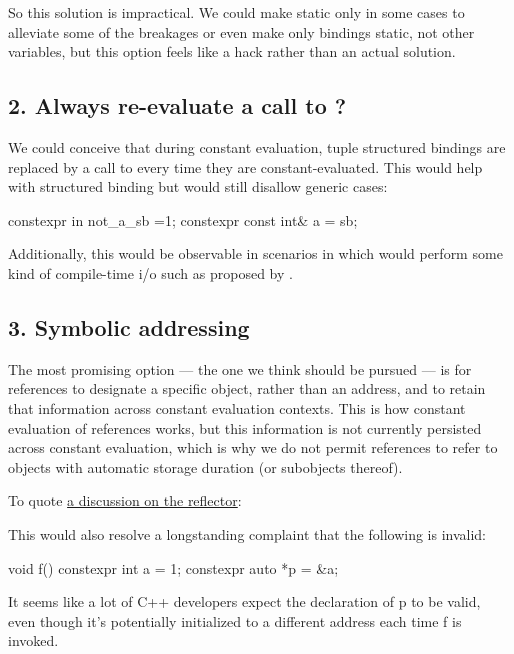 \documentclass{wg21}
\begin{document}
So this solution is impractical. We could make  static only in some cases to alleviate some of the breakages or even make only  bindings static, not other variables, but this option feels like a hack rather than an actual solution.

\subsection{2. Always re-evaluate a call to ?}

We could conceive that during constant evaluation, tuple structured bindings are replaced by a call to  every time they are constant-evaluated.
This would help with  structured binding but would still disallow generic cases:

\begin{colorblock}
constexpr in not_a_sb =1;
constexpr const int&  a = sb;
\end{colorblock}

Additionally, this would be observable in scenarios in which  would perform some kind of compile-time i/o such as proposed by .

\subsection{3. Symbolic addressing}

The most promising option --- the one we think should be pursued --- is for  references to designate a specific object, rather than an address,
and to retain that information across constant evaluation contexts.
This is how constant evaluation of references works, but this information is not currently persisted across constant evaluation, which is why we do not permit
 references to refer to objects with automatic storage duration (or subobjects thereof).

To quote \href{https://lists.isocpp.org/core/2023/04/14163.php}{a discussion on the reflector}:

\begin{quoteblock}
This would also resolve a longstanding complaint that the following is invalid:
\begin{colorblock}
void f() {
    constexpr int a = 1;
    constexpr auto *p = &a;
}
\end{colorblock}

It seems like a lot of C++ developers expect the declaration of p to be valid, even though it's potentially initialized to a different address each time f is invoked.
\end{quoteblock}
\end{document}
